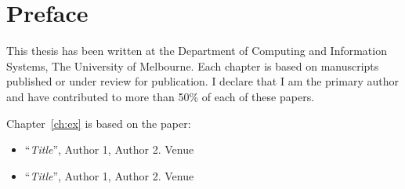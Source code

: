 
\chapter*{Preface}

This thesis has been written at the Department of Computing and Information Systems, The University of Melbourne. Each chapter is based on manuscripts published or under review for publication. I declare that I am the primary author and have contributed to more than 50\% of each of these papers.
\vspace{1cm}

\noindent Chapter~\ref{ch:ex} is based on the paper:
\begin{itemize}
\item ``\textit{Title}'',
Author 1, Author 2. Venue
\item ``\textit{Title}'',
Author 1, Author 2. Venue
\end{itemize}
